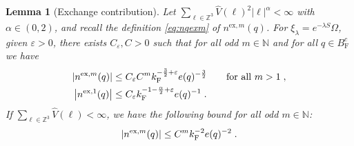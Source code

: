 \documentclass[12pt,a4paper]{article}
\numberwithin{equation}{section}
\newcommand{\1}{\mathbb{I}}
\newcommand{\ex}{\mathrm{ex}}
\newcommand{\F}{\mathrm{F}}
\newcommand{\kF}{k_\F}
\newcommand{\Nbb}{\mathbb{N}}
\newcommand{\Zstar}{\mathbb{Z}^3} %
\newcommand{\Z}{\mathbb{Z}}
\theoremstyle{plain}
\newtheorem{lemma}[theorem]{Lemma}
\theoremstyle{definition}
\theoremstyle{remark}
\theoremstyle{plain}
\theoremstyle{definition}
\theoremstyle{remark}
\begin{document}
\begin{lemma}[Exchange contribution] \label{lem:estnqex}
Let $ \sum_{\ell \in \Zstar} \hat{V}(\ell)^2 |\ell|^\alpha < \infty $ with $ \alpha \in (0,2) $, and recall the definition  \eqref{eq:nqexm} of $ n^{\ex,m}(q) $. For $\xi_\lambda = e^{-\lambda S} \Omega$, given $ \varepsilon > 0 $, there exists $ C_\varepsilon, C > 0 $ such that for all odd $m\in \Nbb$ and for all $ q \in B_{\F}^c $ we have
\begin{equation}
\begin{aligned}
	\abs{n^{\ex,m}(q)}
	&\leq C_\varepsilon C^m \kF^{-\frac 32 + \varepsilon} e(q)^{-\frac 32}
 	\qquad \text{for all } m > 1 \;, \\
 	\abs{n^{\ex,1}(q)}
 	&\leq C_\varepsilon \kF^{-1 - \frac{\alpha}{2} + \varepsilon} e(q)^{-1}  \;.
\label{eq:estnqex_Coulomb}
\end{aligned}
\end{equation}
If $ \sum_{\ell \in \Zstar} \hat{V}(\ell) < \infty $, we have the following bound for all odd $ m \in \mathbb{N} $:
\begin{equation}
	\abs{n^{\ex,m}(q)}
	\leq C^m \kF^{-2} e(q)^{-2} \;. \label{eq:estnqex}
\end{equation}
\end{lemma}
%
%
\end{document}
